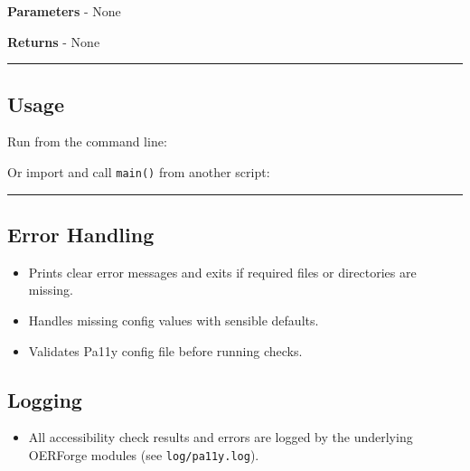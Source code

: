 \textbf{Parameters} - None

\textbf{Returns} - None

\begin{center}\rule{0.5\linewidth}{0.5pt}\end{center}

\subsection{Usage}\label{usage}

Run from the command line:

\begin{Shaded}
\begin{Highlighting}[]
\end{Highlighting}
\end{Shaded}

Or import and call \texttt{main()} from another script:

\begin{Shaded}
\begin{Highlighting}[]
\end{Highlighting}
\end{Shaded}

\begin{center}\rule{0.5\linewidth}{0.5pt}\end{center}

\subsection{Error Handling}\label{error-handling}

\begin{itemize}
\tightlist
\item
  Prints clear error messages and exits if required files or directories
  are missing.
\item
  Handles missing config values with sensible defaults.
\item
  Validates Pa11y config file before running checks.
\end{itemize}

\subsection{Logging}\label{logging}

\begin{itemize}
\tightlist
\item
  All accessibility check results and errors are logged by the
  underlying OERForge modules (see \texttt{log/pa11y.log}).
\end{itemize}

